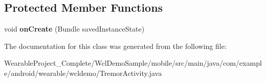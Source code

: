 \subsection*{Protected Member Functions}
\begin{DoxyCompactItemize}
\item 
void {\bfseries on\+Create} (Bundle saved\+Instance\+State)\hypertarget{classcom_1_1example_1_1android_1_1wearable_1_1wcldemo_1_1TremorActivity_ae09d71e1bafbcd4872b225b7ab23a538}{}\label{classcom_1_1example_1_1android_1_1wearable_1_1wcldemo_1_1TremorActivity_ae09d71e1bafbcd4872b225b7ab23a538}

\end{DoxyCompactItemize}


The documentation for this class was generated from the following file\+:\begin{DoxyCompactItemize}
\item 
Wearable\+Project\+\_\+\+Complete/\+Wcl\+Demo\+Sample/mobile/src/main/java/com/example/android/wearable/wcldemo/Tremor\+Activity.\+java\end{DoxyCompactItemize}
